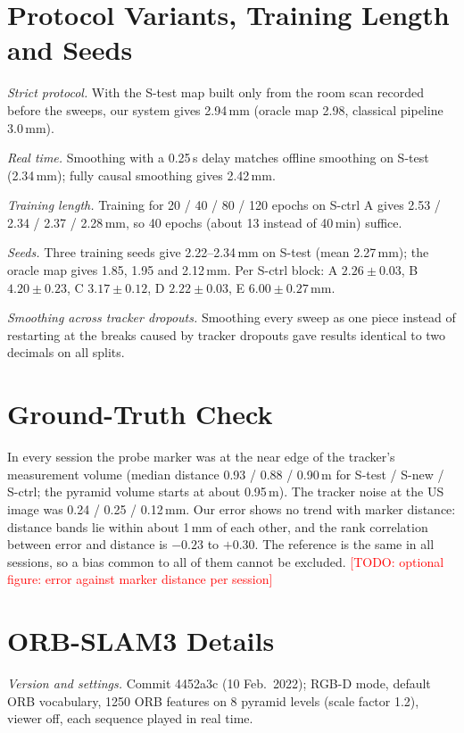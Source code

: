 \documentclass[journal]{IEEEtran}
\newcommand{\tbd}[1]{\textcolor{red}{[TODO: #1]}}
\newcommand{\Stest}{S-test}
\newcommand{\Snew}{S-new}
\newcommand{\Sctrl}{S-ctrl}
\begin{document}
\section{Protocol Variants, Training Length and Seeds}
\label{sec:s_variants}
\emph{Strict protocol.} With the \Stest{} map built only from the room scan recorded before the sweeps, our system gives 2.94\,mm (oracle map 2.98, classical pipeline 3.0\,mm).

\emph{Real time.} Smoothing with a 0.25\,s delay matches offline smoothing on \Stest{} (2.34\,mm); fully causal smoothing gives 2.42\,mm.

\emph{Training length.} Training for 20 / 40 / 80 / 120 epochs on \Sctrl{} A gives 2.53 / 2.34 / 2.37 / 2.28\,mm, so 40 epochs (about 13 instead of 40\,min) suffice.

\emph{Seeds.} Three training seeds give 2.22--2.34\,mm on \Stest{} (mean 2.27\,mm); the oracle map gives 1.85, 1.95 and 2.12\,mm. Per \Sctrl{} block: A $2.26\pm0.03$, B $4.20\pm0.23$, C $3.17\pm0.12$, D $2.22\pm0.03$, E $6.00\pm0.27$\,mm.

\emph{Smoothing across tracker dropouts.} Smoothing every sweep as one piece instead of restarting at the breaks caused by tracker dropouts gave results identical to two decimals on all splits.

\section{Ground-Truth Check}
\label{sec:s_gt}
In every session the probe marker was at the near edge of the tracker's measurement volume (median distance 0.93 / 0.88 / 0.90\,m for \Stest{} / \Snew{} / \Sctrl{}; the pyramid volume starts at about 0.95\,m). The tracker noise at the US image was 0.24 / 0.25 / 0.12\,mm. Our error shows no trend with marker distance: distance bands lie within about 1\,mm of each other, and the rank correlation between error and distance is $-0.23$ to $+0.30$. The reference is the same in all sessions, so a bias common to all of them cannot be excluded. \tbd{optional figure: error against marker distance per session}

\section{ORB-SLAM3 Details}
\label{sec:s_orbslam}
\emph{Version and settings.} Commit 4452a3c (10 Feb.\ 2022); RGB-D mode, default ORB vocabulary, 1250 ORB features on 8 pyramid levels (scale factor 1.2), viewer off, each sequence played in real time.
\end{document}

